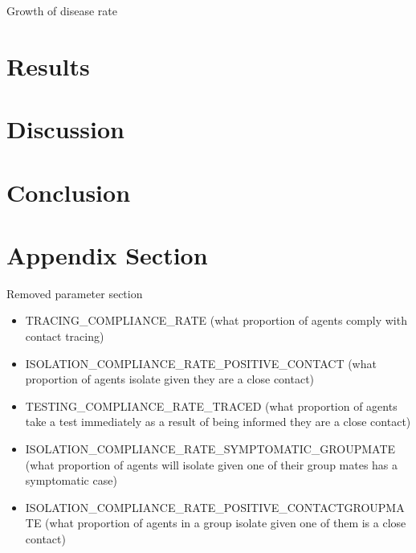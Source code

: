 \documentclass{article}
\begin{document}
Growth of disease rate



\section{Results}

\section{Discussion}

\section{Conclusion}

\newpage
\appendix

\section{Appendix Section}

Removed parameter section
\begin{itemize}

\item TRACING\_COMPLIANCE\_RATE (what proportion of agents comply with contact tracing)
\item ISOLATION\_COMPLIANCE\_RATE\_POSITIVE\_CONTACT (what proportion of agents isolate given they are a close contact) 

\item TESTING\_COMPLIANCE\_RATE\_TRACED (what proportion of agents take a test immediately as a result of being informed they are a close contact)


\item ISOLATION\_COMPLIANCE\_RATE\_SYMPTOMATIC\_GROUPMATE (what proportion of agents will isolate given one of their group mates has a symptomatic case)

\item ISOLATION\_COMPLIANCE\_RATE\_POSITIVE\_CONTACTGROUPMATE (what proportion of agents in a group isolate given one of them is a close contact)
\end{itemize}

{}

\end{document}
